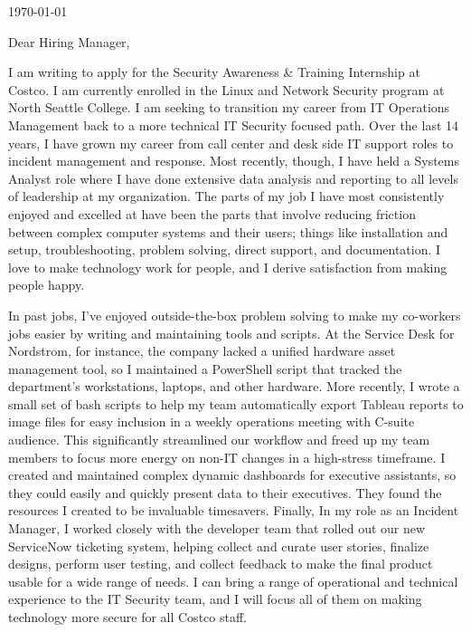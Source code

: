 \documentclass[10pt,oneside]{article}
\begin{document}
\hfill\dte\today
\heading
\vspace{\baselineskip}
\vspace{\baselineskip}

Dear Hiring Manager,

\vspace{\baselineskip}

I am writing to apply for the Security Awareness & Training Internship at Costco. I am currently enrolled in the Linux and Network Security program at North Seattle College. I am seeking to transition my career from IT Operations Management back to a more technical IT Security focused path. Over the last 14 years, I have grown my career from call center and desk side IT support roles to incident management and response. Most recently, though, I have held a Systems Analyst role where I have done extensive data analysis and reporting to all levels of leadership at my organization. The parts of my job I have most consistently enjoyed and excelled at have been the parts that involve reducing friction between complex computer systems and their users; things like installation and setup, troubleshooting, problem solving, direct support, and documentation. I love to make technology work for people, and I derive satisfaction from making people happy.

\vspace{\baselineskip}

In past jobs, I’ve enjoyed outside-the-box problem solving to make my co-workers jobs easier by writing and maintaining tools and scripts. At the Service Desk for Nordstrom, for instance, the company lacked a unified hardware asset management tool, so I maintained a PowerShell script that tracked the department’s workstations, laptops, and other hardware. More recently, I wrote a small set of bash scripts to help my team automatically export Tableau reports to image files for easy inclusion in a weekly operations meeting with C-suite audience. This significantly streamlined our workflow and freed up my team members to focus more energy on non-IT changes in a high-stress timeframe. I created and maintained complex dynamic dashboards for executive assistants, so they could easily and quickly present data to their executives. They found the resources I created to be invaluable timesavers. Finally, In my role as an Incident Manager, I worked closely with the developer team that rolled out our new ServiceNow ticketing system, helping collect and curate user stories, finalize designs, perform user testing, and collect feedback to make the final product usable for a wide range of needs. I can bring a range of operational and technical experience to the IT Security team, and I will focus all of them on making technology more secure for all Costco staff.
\end{document}
